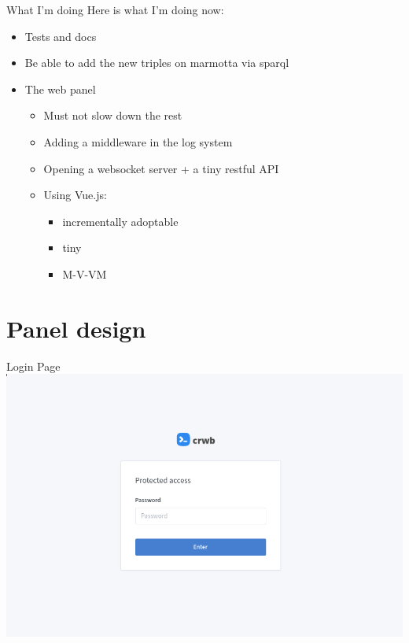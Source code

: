 \documentclass[10pt]{beamer}
\begin{document}
\begin{frame}{What I'm doing}
    Here is what I'm doing now:
    \begin{itemize}
        \item Tests and docs
        \item Be able to add the new triples on marmotta via sparql
        \item The web panel
        \begin{itemize}
            \item Must not slow down the rest
            \item Adding a middleware in the log system
            \item Opening a websocket server + a tiny restful API
            \item Using Vue.js:
            \begin{itemize}
                \item incrementally adoptable
                \item tiny
                \item M-V-VM
            \end{itemize}
        \end{itemize}
    \end{itemize}
\end{frame}

\section{Panel design}

\begin{frame}{Login Page}
    \includegraphics[width=11 cm]{login.png}
\end{frame}
\end{document}
